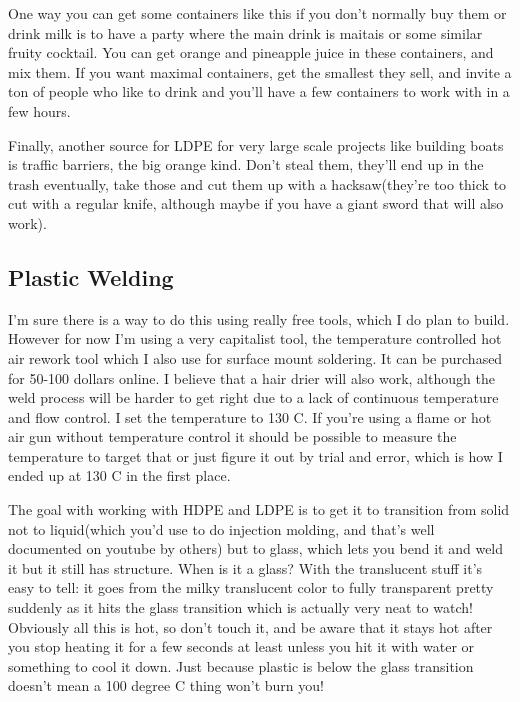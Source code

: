 One way you can get some containers like this if you don't normally buy
them or drink milk is to have a party where the main drink is maitais or
some similar fruity cocktail. You can get orange and pineapple juice in
these containers, and mix them. If you want maximal containers, get the
smallest they sell, and invite a ton of people who like to drink and
you'll have a few containers to work with in a few hours.

Finally, another source for LDPE for very large scale projects like
building boats is traffic barriers, the big orange kind. Don't steal
them, they'll end up in the trash eventually, take those and cut them up
with a hacksaw(they're too thick to cut with a regular knife, although
maybe if you have a giant sword that will also work).

\subsection{Plastic Welding}\label{plastic-welding}

I'm sure there is a way to do this using really free tools, which I do
plan to build. However for now I'm using a very capitalist tool, the
temperature controlled hot air rework tool which I also use for surface
mount soldering. It can be purchased for 50-100 dollars online. I
believe that a hair drier will also work, although the weld process will
be harder to get right due to a lack of continuous temperature and flow
control. I set the temperature to 130 C. If you're using a flame or hot
air gun without temperature control it should be possible to measure the
temperature to target that or just figure it out by trial and error,
which is how I ended up at 130 C in the first place.

The goal with working with HDPE and LDPE is to get it to transition from
solid not to liquid(which you'd use to do injection molding, and that's
well documented on youtube by others) but to glass, which lets you bend
it and weld it but it still has structure. When is it a glass? With the
translucent stuff it's easy to tell: it goes from the milky translucent
color to fully transparent pretty suddenly as it hits the glass
transition which is actually very neat to watch! Obviously all this is
hot, so don't touch it, and be aware that it stays hot after you stop
heating it for a few seconds at least unless you hit it with water or
something to cool it down. Just because plastic is below the glass
transition doesn't mean a 100 degree C thing won't burn you!

